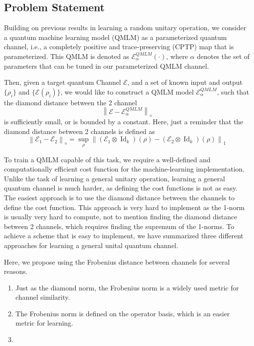 \documentclass[%
 reprint,
superscriptaddress,
 amsmath,amssymb,
 aps,
]{revtex4-2}
\newcommand{\E}{\mathcal{E}}
\newcommand{\norm}[1]{\left\lVert#1\right\rVert}
\begin{document}
\subsection{Problem Statement}
Building on previous results in learning a random unitary operation, we consider a quantum machine learning model (QMLM) as a parameterized quantum channel, i.e., a completely positive and trace-preserving (CPTP) map that is parameterized. This QMLM is denoted as $\mathcal{E}^{QMLM}_{\alpha}(\cdot)$, where $\alpha$ denotes the set of parameters that can be tuned in our parameterized QMLM channel.

Then, given a target quantum Channel $\mathcal{E}$, and a set of known input and output $\{\rho_i\}$ and $\{\mathcal{E}(\rho_i)\}$, we would like to construct a QMLM model $\E^{QMLM}_{\alpha}$, such that the diamond distance between the 2 channel
\begin{equation}
    \norm{\E-\E^{QMLM}_{\alpha}}_\diamond
\end{equation}
is sufficiently small, or is bounded by a constant. Here, just a reminder that the diamond distance between 2 channels is defined as
\begin{equation}
    \norm{\E_1 - \E_2}_{\diamond} = \sup_{\rho} \left\| (\E_1 \otimes \operatorname{Id}_k)(\rho) - (\E_2 \otimes \operatorname{Id}_k)(\rho) \right\|_1
\end{equation}

To train a QMLM capable of this task, we require a well-defined and computationally efficient cost function for the machine-learning implementation. Unlike the task of learning a general unitary operation, learning a general quantum channel is much harder, as defining the cost functions is not as easy. The easiest approach is to use the diamond distance between the channels to define the cost function. This approach is very hard to implement as the 1-norm is usually very hard to compute, not to mention finding the diamond distance between 2 channels, which requires finding the supremum of the 1-norms. To achieve a scheme that is easy to implement, we have summarized three different approaches for learning a general unital quantum channel.

Here, we propose using the Frobenius distance between channels for several reasons.
\begin{enumerate}
    \item Just as the diamond norm, the Frobenius norm is a widely used metric for channel similarity.
    \item The Frobenius norm is defined on the operator basis, which is an easier metric for learning.
    \item 
\end{enumerate}
\end{document}
